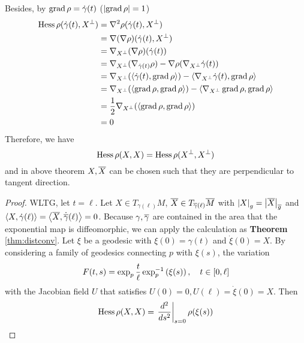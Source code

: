 \begin{enumerate}[label=\arabic{*}]
\begin{rmk}
		Besides, by $\operatorname{grad}\rho = \dot{\gamma}(t)$ ($\left\lvert\operatorname{grad}\rho\right\lvert = 1$)
		\begin{equation*}
			\begin{aligned}
				\operatorname{Hess} \rho(\dot{\gamma}(t),X^\perp) & = \nabla^2 \rho(\dot{\gamma}(t),X^\perp) \\
				&= \nabla (\nabla \rho)(\dot{\gamma}(t),X^\perp) \\
				&= \nabla_{X^\perp} (\nabla \rho)(\dot{\gamma}(t)) \\
				&= \nabla_{X^\perp} (\nabla_{\dot{\gamma}(t)} \rho) - \nabla \rho (\nabla_{X^\perp} \dot{\gamma}(t)) \\
				&= \nabla_{X^\perp}(\left\langle \dot{\gamma}(t),\operatorname{grad}\rho \right\rangle) - \left\langle \nabla_{X^\perp} \dot{\gamma}(t),\operatorname{grad}\rho \right\rangle \\
				&= \nabla_{X^\perp}(\left\langle \operatorname{grad}\rho,\operatorname{grad}\rho \right\rangle) - \left\langle \nabla_{X^\perp} \operatorname{grad}\rho,\operatorname{grad}\rho \right\rangle \\
				&= \frac{1}{2}\nabla_{X^\perp}(\left\langle \operatorname{grad}\rho,\operatorname{grad}\rho \right\rangle) \\
				&= 0
			\end{aligned}
		\end{equation*}
		Therefore, we have
		\begin{equation*}
			\operatorname{Hess} \rho(X,X) = \operatorname{Hess} \rho(X^\perp,X^\perp)
		\end{equation*}
		and in above theorem $X,\overline{X}$ can be chosen such that they are perpendicular to tangent direction.
	\end{rmk}
	\begin{proof}
		WLTG, let $t = \ell$. Let $X \in T_{\gamma(\ell)}M$, $\overline{X} \in T_{\overline{\gamma}(\ell)}\overline{M}$ with $\left\lvert X\right\lvert_g = \left\lvert\overline{X}\right\lvert_{\overline{g}}$ and $\left\langle X,\dot{\gamma}(\ell) \right\rangle = \left\langle \overline{X},\dot{\overline{\gamma}}(\ell) \right\rangle = 0$. Because $\gamma,\overline{\gamma}$ are contained in the area that the exponential map is diffeomorphic, we can apply the calculation as \textbf{Theorem} \ref{thm:distconv}. Let $\xi$ be a geodesic with $\xi(0) = \gamma(t)$ and $\dot{\xi}(0) = X$. By considering a family of geodesics connecting $p$ with $\xi(s)$, the variation
		\begin{equation*}
			F(t,s) = \exp_p \frac{t}{\ell}\exp_p^{-1}\left(\xi(s)\right),\quad t \in [0,\ell]
		\end{equation*}
		with the Jacobian field $U$ that satisfies $U(0) = 0,U(\ell) = \dot{\xi}(0) =X$. Then
		\begin{equation*}
			\begin{aligned}
				\op{Hess}\rho(X,X) &= \lv{\frac{d^2}{ds^2}}_{s=0}\rho(\xi(s)) \\

\end{aligned}
\end{equation*}
\end{proof}
\end{enumerate}
